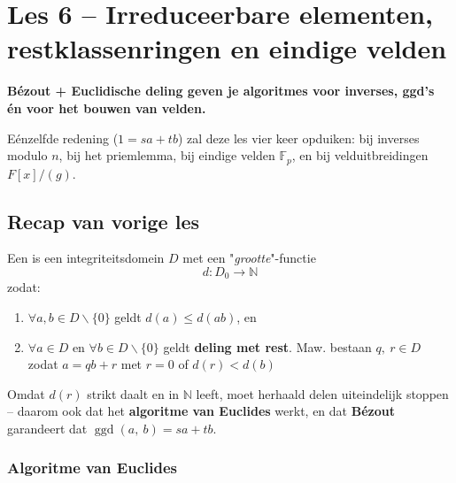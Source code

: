 \section{Les 6 -- Irreduceerbare elementen, restklassenringen en eindige velden}

\begin{roundbox}[CornflowerBlue!10][RoyalPurple]
    \textbf{Bézout + Euclidische deling geven je algoritmes voor inverses, ggd's én voor het bouwen van velden.}

    \vspace{0.25cm}

    Eénzelfde redening ($1 = sa + tb$) zal deze les vier keer opduiken: bij inverses modulo $n$, bij het priemlemma, bij eindige velden $\mathbb{F}_p$, en bij velduitbreidingen $F[x]/(g)$.
\end{roundbox}

\subsection*{Recap van vorige les}

Een  is een integriteitsdomein $D$ met een "\emph{grootte}"-functie
\begin{equation*}
    d : D_0 \to \mathbb{N}
\end{equation*}
zodat:
\begin{enumerate}
    \item $\forall a,b \in D\backslash \{0\}$ geldt $d(a) \le d(ab)$, en
    \item $\forall a \in D$ en $\forall b \in D \backslash \{0\}$ geldt \textbf{deling met rest}. Maw. bestaan $q,\ r \in D$ zodat $a = qb + r$ met $r=0$ of $d(r) < d(b)$
\end{enumerate}
Omdat $d(r)$ strikt daalt en in $\mathbb{N}$ leeft, moet herhaald delen uiteindelijk stoppen -- daarom ook dat het \textbf{algoritme van Euclides} werkt, en dat \textbf{Bézout} garandeert dat $\operatorname{ggd}(a,\ b) = sa + tb$.

\subsubsection*{Algoritme van Euclides}

